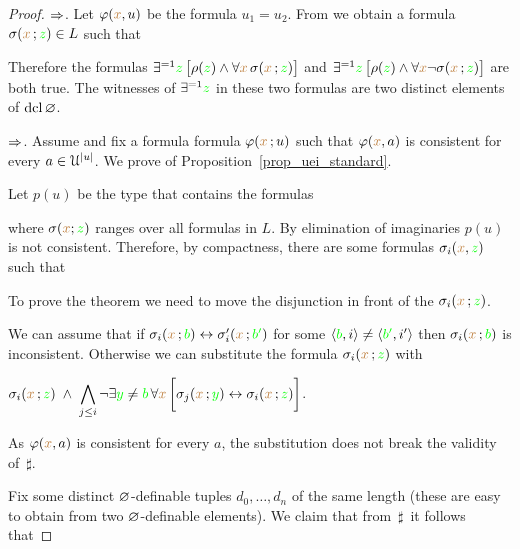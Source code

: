\documentclass[creche.tex]{subfiles}
\begin{document}
\begin{proof}$\Rightarrow$.
Let $\varphi({\color{brown} x},u)$ be the formula $u_1=u_2$.
From  we obtain a formula $\sigma({\color{brown} x}\,;{\color{green} z})\in L$ such that 


Therefore the formulas $\exists^{=1} {\color{green} z}\,\big[\rho({\color{green} z})\wedge\forall {\color{brown}x}\,\sigma({\color{brown} x}\,;{\color{green} z})\big]$ and $\exists^{=1} {\color{green} z}\,\big[\rho({\color{green} z})\wedge\forall {\color{brown}x}\neg\sigma({\color{brown} x}\,;{\color{green} z})\big]$ are both true.
The witnesses of $\exists^{=1} {\color{green} z}$ in these two formulas are two distinct elements of $\mathop{\rm dcl}\varnothing$.

$\Rightarrow$.
Assume  and fix a formula formula $\varphi({\color{brown} x}\,;u)$ such that $\varphi({\color{brown} x},a)$ is consistent for every $a\in\EuScript U^{|u|}$.
We prove  of Proposition~\ref{prop_uei_standard}.

Let $p(u)$ be the type that contains the formulas


where $\sigma({\color{brown} x};{\color{green} z})$ ranges over all formulas in $L$.
By elimination of imaginaries $p(u)$ is not consistent.
Therefore, by compactness, there are some formulas $\sigma_i({\color{brown} x},{\color{green} z})$ such that


To prove the theorem we need to move the disjunction in front of the $\sigma_i({\color{brown} x}\,;{\color{green} z})$.

We can assume that if  $\sigma_i({\color{brown} x}\,;{\color{green} b})\leftrightarrow\sigma_i'({\color{brown} x}\,;{\color{green} b'})$ for some $\langle{\color{green}b},i\rangle\neq\langle{\color{green}b'},i'\rangle$ then $\sigma_i({\color{brown} x}\,;{\color{green} b})$ is inconsistent.
Otherwise we can substitute the formula $\sigma_i({\color{brown} x}\,;{\color{green} z})$ with  


\hfil$\displaystyle\sigma_i({\color{brown} x}\,;{\color{green} z}) \;\wedge\; \bigwedge_{j\le i}\neg\exists{\color{green}y}\neq{\color{green}b}\,\forall {\color{brown}x}\,\bigg[\sigma_j({\color{brown} x}\,;{\color{green} y})\leftrightarrow\sigma_i({\color{brown} x}\,;{\color{green} z})\bigg]$.


As $\varphi({\color{brown} x},a)$ is consistent for every $a$, the substitution does not break the validity of $\,\sharp$.

Fix some distinct $\varnothing$-definable tuples $d_0,\dots, d_n$ of the same length (these are easy to obtain from two $\varnothing$-definable elements).
We claim that from $\,\sharp\,$ it follows that


\end{proof}
\end{document}
